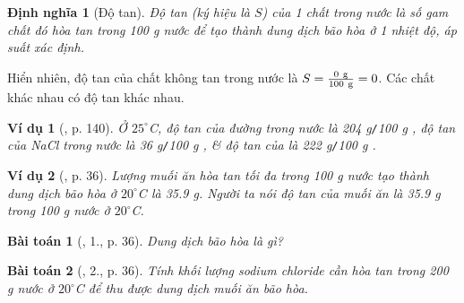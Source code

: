 \documentclass{article}
\newtheorem{baitoan}{Bài toán}
\newtheorem{dinhnghia}{Định nghĩa}
\newtheorem{vidu}{Ví dụ}
\begin{document}
\begin{dinhnghia}[Độ tan]
	\emph{Độ tan} (ký hiệu là $S$) của 1 chất trong nước là số gam chất đó hòa tan trong \emph{100 g} nước để tạo thành dung dịch bão hòa ở 1 nhiệt độ, áp suất xác định.
\end{dinhnghia}
Hiển nhiên, độ tan của chất không tan trong nước là $S = \frac{\rm0\ g}{\rm100\ g} = 0$. Các chất khác nhau có độ tan khác nhau.

\begin{vidu}[\cite{SGK_Hoa_Hoc_8}, p. 140]
	Ở $25^\circ$\emph{C}, độ tan của đường trong nước là \emph{204 g\texttt{/}100 g }, độ tan của \emph{NaCl} trong nước là \emph{36 g\texttt{/}100 g }, \& độ tan của \emph{} là \emph{222 g\texttt{/}100 g }.
\end{vidu}

\begin{vidu}[\cite{SGK_KHTN_8_Canh_Dieu}, p. 36]
	Lượng muối ăn hòa tan tối đa trong \emph{100 g} nước tạo thành dung dịch bão hòa ở $20^\circ$\emph{C} là \emph{35.9 g}. Người ta nói độ tan của muối ăn là \emph{35.9 g} trong \emph{100 g nước} ở $20^\circ$\emph{C}.
\end{vidu}

\begin{baitoan}[\cite{SGK_KHTN_8_Canh_Dieu}, 1., p. 36]
	Dung dịch bão hòa là gì?
\end{baitoan}

\begin{baitoan}[\cite{SGK_KHTN_8_Canh_Dieu}, 2., p. 36]
	Tính khối lượng sodium chloride cần hòa tan trong \emph{200 g} nước ở $20^\circ$\emph{C} để thu được dung dịch muối ăn bão hòa.
\end{baitoan}
\end{document}
